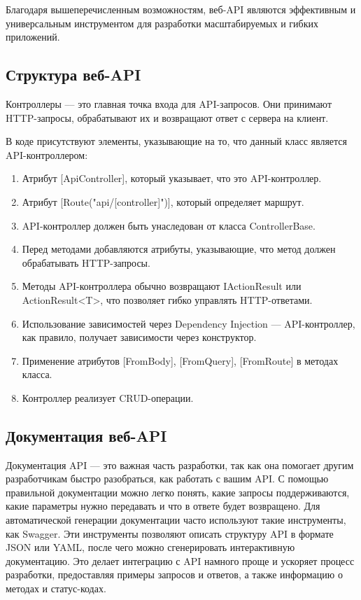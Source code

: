\documentclass[a4paper,12pt]{report}
\begin{document}
Благодаря вышеперечисленным возможностям, веб-API являются эффективным и универсальным инструментом для разработки масштабируемых и гибких приложений.


\subsection{Структура веб-API}

Контроллеры –-- это главная точка входа для API-запросов. Они принимают HTTP-запросы, обрабатывают их и возвращают ответ с сервера на клиент.

В коде присутствуют элементы, указывающие на то, что данный класс является API-контроллером:
\begin{enumerate}
  \item
      Атрибут [ApiController], который указывает, что это API-контроллер.
  \item
      Атрибут [Route("api/[controller]")], который определяет маршрут.
  \item
      API-контроллер должен быть унаследован от класса ControllerBase.
  \item
      Перед методами добавляются атрибуты, указывающие, что метод должен обрабатывать HTTP-запросы.
  \item
      Методы API-контроллера обычно возвращают IActionResult или ActionResult<T>, что позволяет гибко управлять HTTP-ответами.
  \item
      Использование зависимостей через Dependency Injection --- API-контроллер, как правило, получает зависимости через конструктор.
  \item
      Применение атрибутов [FromBody], [FromQuery], [FromRoute] в методах класса.
  \item
      Контроллер реализует CRUD-операции.
\end{enumerate}

\subsection{Документация веб-API}

Документация API --- это важная часть разработки, так как она помогает другим разработчикам быстро разобраться, как работать с вашим API. 
С помощью правильной документации можно легко понять, какие запросы поддерживаются, какие параметры нужно передавать и что в ответе будет возвращено. 
Для автоматической генерации документации часто используют такие инструменты, как Swagger. Эти инструменты позволяют описать структуру API в формате JSON или YAML, 
после чего можно сгенерировать интерактивную документацию. Это делает интеграцию с API намного проще и ускоряет процесс разработки, предоставляя примеры запросов и ответов, 
а также информацию о методах и статус-кодах.
\end{document}
